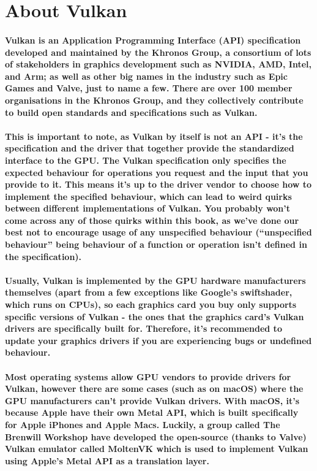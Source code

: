 \newpage
\section{About Vulkan}\label{about-vulkan}

\paragraph{
Vulkan is an Application Programming Interface (API) specification
developed and maintained by the Khronos Group, a consortium of lots of stakeholders in graphics development such as NVIDIA, AMD, Intel, and Arm; as well as other big names in the industry such as Epic Games and Valve, just to name a few. There are over 100 member organisations in the Khronos Group, and they collectively contribute to build open standards and specifications such as Vulkan.
}

\paragraph{
This is important to note, as Vulkan by itself is not an API - it's the specification and the driver that together provide the standardized interface to the GPU. The Vulkan specification only specifies the expected behaviour for operations you request and the input that you provide to it. This means it's up to the driver vendor to choose how to implement the specified behaviour, which can lead to weird quirks between different implementations of Vulkan. You probably won't come across any of those quirks within this book, as we've done our best not to encourage usage of any unspecified behaviour (``unspecified behaviour'' being behaviour of a function or operation isn't defined in the specification).
}

\paragraph{
Usually, Vulkan is implemented by the GPU hardware manufacturers
themselves (apart from a few exceptions like Google's swiftshader, which runs on CPUs), so each graphics card you buy only supports specific versions of Vulkan - the ones that the graphics card's Vulkan drivers are specifically built for. Therefore, it's recommended to update your graphics drivers if you are experiencing bugs or undefined behaviour.
}

\paragraph{
Most operating systems allow GPU vendors to provide drivers for Vulkan, however there are some cases (such as on macOS) where the GPU manufacturers can't provide Vulkan drivers. With macOS, it's because Apple have their own Metal API, which is built specifically for Apple iPhones and Apple Macs. Luckily, a group called The Brenwill Workshop have developed the open-source (thanks to Valve) Vulkan emulator called MoltenVK which is used to implement Vulkan using Apple's Metal API as a translation layer.
}

